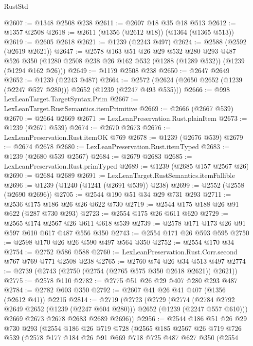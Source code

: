 \begin{lexlean}{RustStd}
\begin{coremodule}
{\begin{coremodule}
{{{{{{{@2607 := @1348 @2508 @238
@2611 := @2607 @18 @35 @18 @513
@2612 := @1357 @2508
@2618 := @2611 (@1356 (@2612 @18)) (@1364 (@1365 @513))
@2619 := @2605 @2618
@2621 := @1239 (@2243 @497)
@2624 := @2588 (@2592 (@2619 @2621))
@2647 := @2578
    @163
    @51
    @26
    @29
    @532
    @280
    @293
    @487
    @526
    @350
    (@1280 @2508 @238 @26 @162 @532 (@1288 (@1289 @532)) (@1239 (@1294 @162 @26)))
@2649 := @1179 @2508 @238
@2650 := @2647 @2649
@2652 := @1239 (@2243 @487)
@2664 := @2572 (@2624 (@2650 @2652 (@1239 (@2247 @527 @280))) @2652 (@1239 (@2247 @493 @535)))
@2666 := @998 LexLeanTarget.TargetSyntax.Prim
@2667 := LexLeanTarget.RustSemantics.itemPrimitive
@2669 := @2666 (@2667 @539)
@2670 := @2664 @2669
@2671 := LexLeanPreservation.Rust.plainItem
@2673 := @1239 (@2671 @539)
@2674 := @2670 @2673
@2676 := LexLeanPreservation.Rust.itemOK @769
@2678 := @1239 (@2676 @539)
@2679 := @2674 @2678
@2680 := LexLeanPreservation.Rust.itemTyped
@2683 := @1239 (@2680 @539 @2567)
@2684 := @2679 @2683
@2685 := LexLeanPreservation.Rust.primTyped
@2689 := @1239 (@2685 @157 @2567 @26)
@2690 := @2684 @2689
@2691 := LexLeanTarget.RustSemantics.itemFallible
@2696 := @1239 (@1240 (@1241 (@2691 @539)) @238)
@2699 := @2552 (@2558 (@2690 @2696))
@2705 := @2544 @190 @51 @34 @29 @731 @293
@2711 := @2536 @175 @186 @26 @26 @622 @730
@2719 := @2544 @175 @188 @26 @91 @622 (@287 @730 @293)
@2723 := @2554 @175 @26 @611 @620
@2729 := @2565 @174 @2567 @26 @611 @618 @539
@2739 := @2578 @171 @173 @26 @91 @597 @610 @617 @487 @556 @350
@2743 := @2554 @171 @26 @593 @595
@2750 := @2598 @170 @26 @26 @590 @497 @564 @350
@2752 := @2554 @170 @34
@2754 := @2752 @586 @588
@2760 := LexLeanPreservation.Rust.Corr.second @767 @769 @771 @2508 @238
@2765 := @2760 @74 @26 @34 @513 @497
@2774 := @2739 (@2743 (@2750 (@2754 (@2765 @575 @350 @2618 @2621)) @2621))
@2775 := @2578 @110
@2782 := @2775 @51 @26 @29 @407 @280 @293 @487
@2784 := @2782 @603 @350
@2792 := @2607 @41 @26 @41 @407 (@1356 (@2612 @41)) @2215
@2814 := @2719
    (@2723
      (@2729
        (@2774 (@2784 @2792 @2649 @2652 (@1239 (@2247 @604 @280))) @2652 (@1239 (@2247 @557 @610)))
        @2669
        @2673
        @2678
        @2683
        @2689
        @2696))
@2956 := @2544
    @186
    @51
    @26
    @29
    @730
    @293
    (@2554
      @186
      @26
      @719
      @728
      (@2565
        @185
        @2567
        @26
        @719
        @726
        @539
        (@2578
          @177
          @184
          @26
          @91
          @669
          @718
          @725
          @487
          @627
          @350
          (@2554
}}}}}}}
\end{coremodule}}
\end{coremodule}
\end{lexlean}
